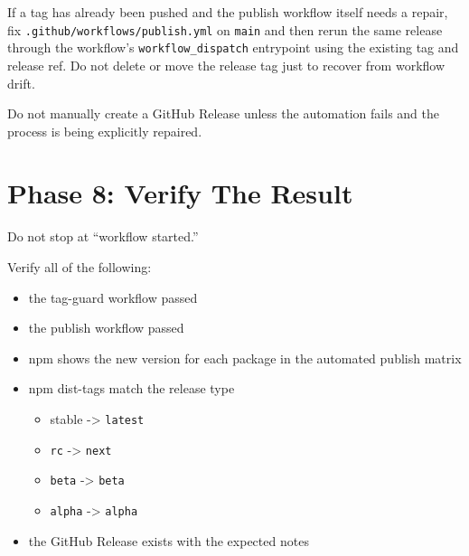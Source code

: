 If a tag has already been pushed and the publish workflow itself needs a repair, fix \texttt{.\allowbreak{}g\allowbreak{}i\allowbreak{}t\allowbreak{}h\allowbreak{}u\allowbreak{}b\allowbreak{}/\allowbreak{}w\allowbreak{}o\allowbreak{}r\allowbreak{}k\allowbreak{}f\allowbreak{}l\allowbreak{}o\allowbreak{}w\allowbreak{}s\allowbreak{}/\allowbreak{}p\allowbreak{}u\allowbreak{}b\allowbreak{}l\allowbreak{}i\allowbreak{}s\allowbreak{}h\allowbreak{}.\allowbreak{}y\allowbreak{}m\allowbreak{}l} on \texttt{m\allowbreak{}a\allowbreak{}i\allowbreak{}n} and then rerun the same release through the workflow's \texttt{w\allowbreak{}o\allowbreak{}r\allowbreak{}k\allowbreak{}f\allowbreak{}l\allowbreak{}o\allowbreak{}w\allowbreak{}\_\allowbreak{}d\allowbreak{}i\allowbreak{}s\allowbreak{}p\allowbreak{}a\allowbreak{}t\allowbreak{}c\allowbreak{}h} entrypoint using the existing tag and release ref. Do not delete or move the release tag just to recover from workflow drift.

Do not manually create a GitHub Release unless the automation fails and the process is being explicitly repaired.

\section{Phase 8: Verify The Result}\label{record-274-phase-8-verify-the-result}

Do not stop at ``workflow started.''

Verify all of the following:

\begin{itemize}
\tightlist
\item
  the tag-guard workflow passed
\item
  the publish workflow passed
\item
  npm shows the new version for each package in the automated publish matrix
\item
  npm dist-tags match the release type

  \begin{itemize}
  \tightlist
  \item
    stable -\textgreater{} \texttt{l\allowbreak{}a\allowbreak{}t\allowbreak{}e\allowbreak{}s\allowbreak{}t}
  \item
    \texttt{r\allowbreak{}c} -\textgreater{} \texttt{n\allowbreak{}e\allowbreak{}x\allowbreak{}t}
  \item
    \texttt{b\allowbreak{}e\allowbreak{}t\allowbreak{}a} -\textgreater{} \texttt{b\allowbreak{}e\allowbreak{}t\allowbreak{}a}
  \item
    \texttt{a\allowbreak{}l\allowbreak{}p\allowbreak{}h\allowbreak{}a} -\textgreater{} \texttt{a\allowbreak{}l\allowbreak{}p\allowbreak{}h\allowbreak{}a}
  \end{itemize}
\item
  the GitHub Release exists with the expected notes
\end{itemize}

